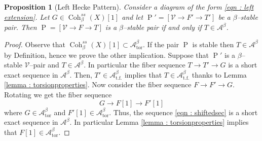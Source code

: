 \documentclass[11pt]{article}
\newtheorem{proposition}[theorem]{Proposition}
\newcommand{\abeta}{\mathcal{A}^{\beta}}
\newcommand{\abetator}{\mathcal{A}^{\beta}_{\operatorname{tor}}}
\newcommand{\abetatf}{\mathcal{A}^{\beta}_{\operatorname{t.f.}}}
\newcommand{\cohbetass}{\operatorname{Coh}^{ss}_{\beta}(X)}
\newcommand{\framing}{\mathcal{V}}
\begin{document}
\begin{proposition}[Left Hecke Pattern]\label{prop : leftthecke}
     Consider a diagram of the form \eqref{eqn : left extension}. Let $G\in \cohbetass[1]$ and let $\operatorname{P}' = [\mathcal{V}\rightarrow F' \rightarrow T']$ be a $\beta$--stable pair. Then $\operatorname{P} = [\mathcal{V}\rightarrow F \rightarrow T]$ is a $\beta$--stable pair if and only if $T\in \abeta$.
\end{proposition}
\begin{proof}
    Observe that $\cohbetass[1] \subset \abetator$. If the pair $\operatorname{P}$ is stable then $T\in \abeta$ by Definition, hence we prove the other implication.\newline
    \noindent Suppose that $\operatorname{P}'$ is a $\beta$--stable $\framing$--pair and $T\in \abeta$. In particular the fiber sequence $T\rightarrow T'\rightarrow G$ is a short exact sequence in $\abeta$. Then, $T'\in \abetatf$ implies that $T\in \abetatf$ thanks to Lemma \ref{lemma : torsionproperties}. Now consider the fiber sequence $F\rightarrow F'\rightarrow G$. Rotating we get the fiber sequence
    \begin{equation}\label{eqn : shiftedsec}
        G \rightarrow F[1]\rightarrow F'[1]        
    \end{equation}
    where $G\in \abetator$ and $F'[1]\in \abetator$. Thus, the sequence \eqref{eqn : shiftedsec} is a short exact sequence in $\abeta$. In particular Lemma \ref{lemma : torsionproperties} implies that $F[1]\in \abetator$.
\end{proof}



\bigskip
\end{document}
